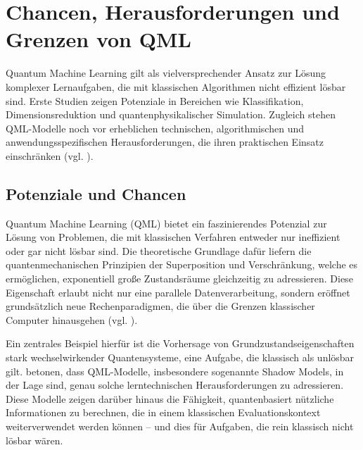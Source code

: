 

\section{Chancen, Herausforderungen und Grenzen von QML}
Quantum Machine Learning gilt als vielversprechender Ansatz zur Lösung komplexer Lernaufgaben, die mit klassischen Algorithmen nicht effizient lösbar sind. Erste Studien zeigen Potenziale in Bereichen wie Klassifikation, Dimensionsreduktion und quantenphysikalischer Simulation. Zugleich stehen QML-Modelle noch vor erheblichen technischen, algorithmischen und anwendungsspezifischen Herausforderungen, die ihren praktischen Einsatz einschränken (vgl. \cite{gujjuQuantumMachineLearning2024, jerbiShadowsQuantumMachine2024, peral-garciaSystematicLiteratureReview2024}).

\subsection{Potenziale und Chancen}
Quantum Machine Learning (QML) bietet ein faszinierendes Potenzial zur Lösung von Problemen, die mit klassischen Verfahren entweder nur ineffizient oder gar nicht lösbar sind. Die theoretische Grundlage dafür liefern die quantenmechanischen Prinzipien der Superposition und Verschränkung, welche es ermöglichen, exponentiell große Zustandsräume gleichzeitig zu adressieren. Diese Eigenschaft erlaubt nicht nur eine parallele Datenverarbeitung, sondern eröffnet grundsätzlich neue Rechenparadigmen, die über die Grenzen klassischer Computer hinausgehen (vgl. \cite{peral-garciaSystematicLiteratureReview2024}).

Ein zentrales Beispiel hierfür ist die Vorhersage von Grundzustandseigenschaften stark wechselwirkender Quantensysteme, eine Aufgabe, die klassisch als unlösbar gilt. \cite{jerbiShadowsQuantumMachine2024} betonen, dass QML-Modelle, insbesondere sogenannte Shadow Models, in der Lage sind, genau solche lerntechnischen Herausforderungen zu adressieren. Diese Modelle zeigen darüber hinaus die Fähigkeit, quantenbasiert nützliche Informationen zu berechnen, die in einem klassischen Evaluationskontext weiterverwendet werden können – und dies für Aufgaben, die rein klassisch nicht lösbar wären. 

